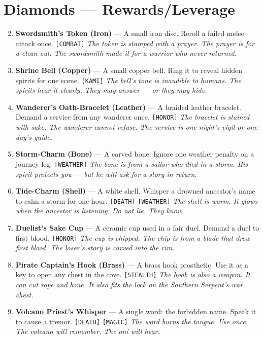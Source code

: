 \section*{Diamonds --- Rewards/Leverage}
\label{sec:nihori-rewards}
\begin{enumerate}
\setcounter{enumi}{1}
\item \textbf{Swordsmith's Token (Iron)} --- A small iron disc. Reroll a failed melee attack once. \texttt{[COMBAT]}
  \hfill \textit{The token is stamped with a prayer. The prayer is for a clean cut. The swordsmith made it for a warrior who never returned.}
\item \textbf{Shrine Bell (Copper)} --- A small copper bell. Ring it to reveal hidden spirits for one scene. \texttt{[KAMI]}
  \hfill \textit{The bell's tone is inaudible to humans. The spirits hear it clearly. They may answer --- or they may hide.}
\item \textbf{Wanderer's Oath-Bracelet (Leather)} --- A braided leather bracelet. Demand a service from any wanderer once. \texttt{[HONOR]}
  \hfill \textit{The bracelet is stained with sake. The wanderer cannot refuse. The service is one night's vigil or one day's guide.}
\item \textbf{Storm-Charm (Bone)} --- A carved bone. Ignore one weather penalty on a journey leg. \texttt{[WEATHER]}
  \hfill \textit{The bone is from a sailor who died in a storm. His spirit protects you --- but he will ask for a story in return.}
\item \textbf{Tide-Charm (Shell)} --- A white shell. Whisper a drowned ancestor's name to calm a storm for one hour. \texttt{[DEATH]} \texttt{[WEATHER]}
  \hfill \textit{The shell is warm. It glows when the ancestor is listening. Do not lie. They know.}
\item \textbf{Duelist's Sake Cup} --- A ceramic cup used in a fair duel. Demand a duel to first blood. \texttt{[HONOR]}
  \hfill \textit{The cup is chipped. The chip is from a blade that drew first blood. The loser's story is carved into the rim.}
\item \textbf{Pirate Captain's Hook (Brass)} --- A brass hook prosthetic. Use it as a key to open any chest in the cove. \texttt{[STEALTH]}
  \hfill \textit{The hook is also a weapon. It can cut rope and bone. It also fits the lock on the Southern Serpent's war chest.}
\item \textbf{Volcano Priest's Whisper} --- A single word: the forbidden name. Speak it to cause a tremor. \texttt{[DEATH]} \texttt{[MAGIC]}
  \hfill \textit{The word burns the tongue. Use once. The volcano will remember. The oni will hear.}

\end{enumerate}
